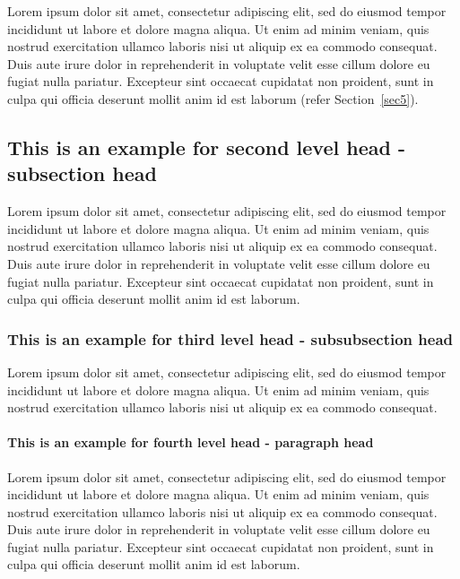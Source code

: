 \documentclass[unnumsec,webpdf,contemporary,large]{oup-authoring-template}%
\theoremstyle{thmstyleone}%
\theoremstyle{thmstyletwo}%
\theoremstyle{thmstylethree}%
\begin{document}
Lorem ipsum dolor sit amet, consectetur adipiscing elit, sed do eiusmod tempor incididunt ut labore et dolore magna aliqua. Ut enim ad minim veniam, quis nostrud exercitation ullamco laboris nisi ut aliquip ex ea commodo consequat. Duis aute irure dolor in reprehenderit in voluptate velit esse cillum dolore eu fugiat nulla pariatur. Excepteur sint occaecat cupidatat non proident, sunt in culpa qui officia deserunt mollit anim id est laborum (refer Section~\ref{sec5}).

\subsection{This is an example for second level head - subsection head}\label{subsec1}

Lorem ipsum dolor sit amet, consectetur adipiscing elit, sed do eiusmod tempor incididunt ut labore et dolore magna aliqua. Ut enim ad minim veniam, quis nostrud exercitation ullamco laboris nisi ut aliquip ex ea commodo consequat. Duis aute irure dolor in reprehenderit in voluptate velit esse cillum dolore eu fugiat nulla pariatur. Excepteur sint occaecat cupidatat non proident, sunt in culpa qui officia deserunt mollit anim id est laborum.

\subsubsection{This is an example for third level head - subsubsection head}\label{subsubsec1}

Lorem ipsum dolor sit amet, consectetur adipiscing elit, sed do
eiusmod tempor incididunt ut labore et dolore magna aliqua. Ut enim ad minim veniam, quis nostrud exercitation ullamco laboris nisi ut aliquip ex ea commodo consequat. %

\paragraph{This is an example for fourth level head - paragraph head}

Lorem ipsum dolor sit amet, consectetur adipiscing elit, sed do eiusmod tempor incididunt ut labore et dolore magna aliqua. Ut enim ad minim veniam, quis nostrud exercitation ullamco laboris nisi ut aliquip ex ea commodo consequat. Duis aute irure dolor in reprehenderit in voluptate velit esse cillum dolore eu fugiat nulla pariatur. Excepteur sint occaecat cupidatat non proident, sunt in culpa qui officia deserunt mollit anim id est laborum.
\end{document}

